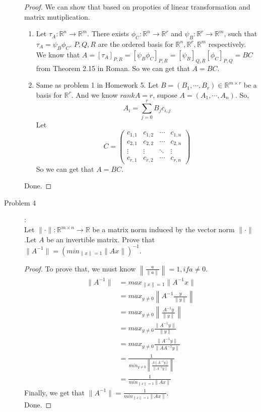\documentclass[a4paper]{article}
\begin{document}
\begin{description}
  \begin{proof}
      We can show that based on propoties of linear transformation and matrix mutiplication.
      \begin{enumerate}[1)]
        \item Let $\tau_{A}: \mathbb{R}^{n}\to\mathbb{R}^{m}$. There exists $\phi_{C}:\mathbb{R}^{n}\to\mathbb{R}^{r}$ and $\psi_{B}:\mathbb{R}^{r}\to\mathbb{R}^{m}$, such that $\tau_{A}=\psi_{B}\phi_{C}$. $P, Q, R$ are the ordered basis for $\mathbb{R}^{n},\mathbb{R}^{r},\mathbb{R}^{m}$ respectively.\\
        We know that $A=[\tau_{A}]_{P,R}=[\psi_{B}\phi_{C}]_{P,R}=[\psi_{B}]_{Q,R}[\phi_{C}]_{P,Q}=BC$ from Theorem 2.15 in Roman. So we can get that $A=BC$.
        \item Same as problem 1 in Homework 5. Let $B=(B_{1},\cdots,B_{r})\in \mathbb{R}^{m\times r}$ be a basis for $\mathbb{R}^{r}$. And we know $rank{A}=r$, supose $A=(A_{1},\cdots,A_{n})$. So,
            $$A_{i}=\sum_{j=0}^{r}B_{j}c_{i,j}$$
            Let
            \begin{equation*}
              C=\left(
              \begin{matrix}
                c_{1,1}&c_{1,2}&\cdots&c_{1,n}\\
                c_{2,1}&c_{2,2}&\cdots&c_{2,n}\\
                \vdots&\vdots&\ddots&\vdots\\
                c_{r,1}&c_{r,2}&\cdots&c_{r,n}
              \end{matrix}
              \right)
            \end{equation*}
            So we can get that $A=BC$.
      \end{enumerate}
      Done.
  \end{proof}

  \item[Problem 4]:\\
   Let $\|\cdot\|:\mathbb{R}^{m\times n}\to\mathbb{R}$ be a matrix norm induced by the vector norm $\|\cdot\|$.Let $A$ be an invertible matrix. Prove that $\|A^{-1}\|=(min_{\|x\|=1}\|Ax\|)^{-1}$.

  \begin{proof}
    To prove that, we must know $\left\|\frac{a}{\|a\|}\right\|=1, if a\ne 0$.
    \begin{align*}
      \|A^{-1}\|&=max_{\|x\|=1}\|A^{-1}x\|\\
      &=max_{y\ne 0}\left\| A^{-1}\frac{y}{\|y\|}\right\| \\
      &=max_{y\ne 0}\left\| \frac{A^{-1}y}{\|y\|}\right\| \\
      &=max_{y\ne 0}\frac{\|A^{-1}y\|}{\|y\|}\\
      &=max_{y\ne 0}\frac{\|A^{-1}y\|}{\|AA^{-1}y\|}\\
      &=\frac{1}{min_{y\ne 0}\left\| \frac{A(A^{-1}y)}{\|A^{-1}y\|}\right\|}\\
      &=\frac{1}{min_{\|x\|=1}\|Ax\|}
    \end{align*}
    Finally, we get that $\|A^{-1}\|=\frac{1}{min_{\|x\|=1}\|Ax\|}$.\\
    Done.
  \end{proof}


\end{description}
\end{document}
